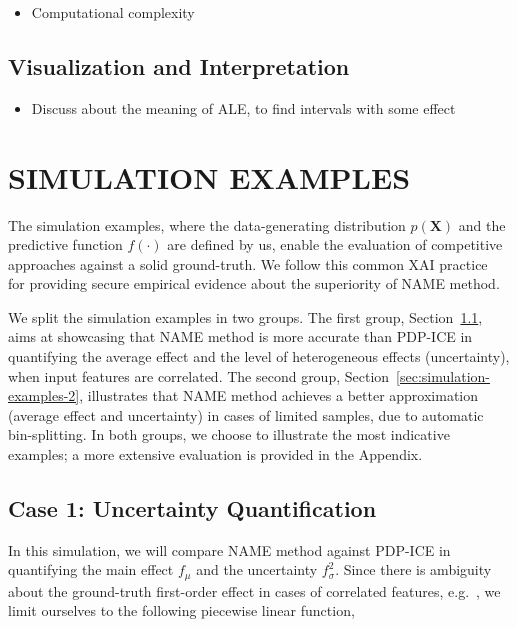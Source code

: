 \documentclass[twoside]{article}
\begin{document}
\noindent

\begin{itemize}
\item Computational complexity
\end{itemize}

\subsection{Visualization and Interpretation}
\label{sec:visualization}

\begin{itemize}
\item Discuss about the meaning of ALE, to find intervals with some effect
\end{itemize}

\section{SIMULATION EXAMPLES}
\label{sec:simulation-examples}

The simulation examples, where the data-generating distribution
\(p(\mathbf{X})\) and the predictive function \(f(\cdot)\) are defined
by us, enable the evaluation of competitive approaches against a solid
ground-truth. We follow this common XAI
practice~\citep{aas2021explaining, herbinger2022repid} for providing
secure empirical evidence about the superiority of NAME method.

We split the simulation examples in two groups. The first group,
Section~\ref{sec:simulation-examples-1}, aims at showcasing that NAME
method is more accurate than PDP-ICE in quantifying the average effect
and the level of heterogeneous effects (uncertainty), when input
features are correlated. The second group,
Section~\ref{sec:simulation-examples-2}, illustrates that NAME method
achieves a better approximation (average effect and uncertainty) in
cases of limited samples, due to automatic bin-splitting. In both
groups, we choose to illustrate the most indicative examples; a more
extensive evaluation is provided in the Appendix.

\subsection{Case 1: Uncertainty Quantification}
\label{sec:simulation-examples-1}

In this simulation, we will compare NAME method against PDP-ICE in
quantifying the main effect \(f_\mu\) and the uncertainty
\(f_\sigma^2\). Since there is ambiguity about the ground-truth
first-order effect in cases of correlated
features, e.g.~\citep{apley2020visualizing,Gromping2020MAEP}, we limit
ourselves to the following piecewise linear function,
\end{document}
